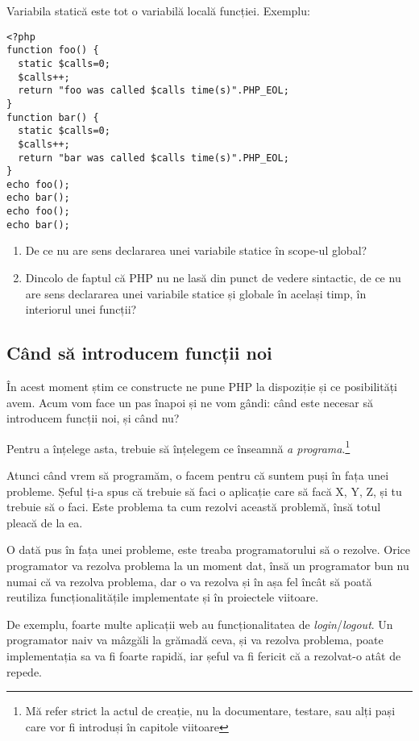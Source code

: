 Variabila statică este tot o variabilă locală funcției. Exemplu:
\begin{lstlisting}
<?php
function foo() {
  static $calls=0;
  $calls++;
  return "foo was called $calls time(s)".PHP_EOL;
}
function bar() {
  static $calls=0;
  $calls++;
  return "bar was called $calls time(s)".PHP_EOL;
}
echo foo();
echo bar();
echo foo();
echo bar();
\end{lstlisting}

\begin{Exercise}[title={static vs. global}]
\begin{enumerate}
	\item De ce nu are sens declararea unei variabile statice în scope-ul global?
	\item Dincolo de faptul că PHP nu ne lasă din punct de vedere sintactic, de ce nu are sens
declararea unei variabile statice și globale în același timp, în interiorul unei
funcții?
\end{enumerate}
\end{Exercise}

\subsection{Când să introducem funcții noi}
În acest moment știm ce constructe ne pune PHP la dispoziție și ce
posibilități avem. Acum vom face un pas înapoi și ne vom gândi:
când este necesar să introducem funcții noi, și când nu?

Pentru a înțelege asta, trebuie să înțelegem ce înseamnă
\textit{a programa}.\footnote{Mă refer strict la actul de creație,
nu la documentare, testare, sau alți pași care vor fi introduși
în capitole viitoare}

Atunci când vrem să programăm, o facem pentru că suntem puși în
fața unei probleme. Șeful ți-a spus că trebuie să faci o aplicație
care să facă X, Y, Z, și tu trebuie să o faci. Este problema ta
cum rezolvi această problemă, însă totul pleacă de la ea.

O dată pus în fața unei probleme, este treaba programatorului
să o rezolve. Orice programator va rezolva problema la un
moment dat, însă un programator bun nu numai că va rezolva
problema, dar o va rezolva și în așa fel încât să poată
reutiliza funcționalitățile implementate și în proiectele
viitoare.

De exemplu, foarte multe aplicații web au funcționalitatea
de \textit{login}/\textit{logout}. Un programator naiv
va mâzgăli la grămadă ceva, și va rezolva problema, poate
implementația sa va fi foarte rapidă, iar șeful va fi
fericit că a rezolvat-o atât de repede.

